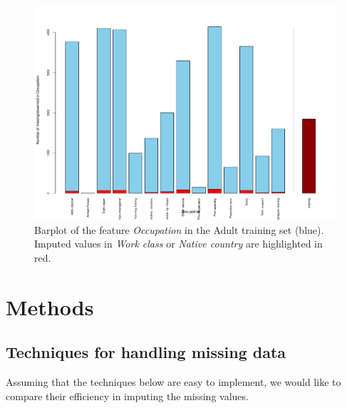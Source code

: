 \documentclass[12pt]{article}
\begin{document}
\begin{figure}[htbp] 
   \centering
   \includegraphics[scale=0.6]{barplot-occ-missing.pdf} 
   \caption{Barplot of the feature \textit{Occupation} in the Adult training set (blue). Imputed values in \textit{Work class} or \textit{Native country} are highlighted in red.}
   \label{barplot-occ-missing}
\end{figure}

\section{Methods}


\subsection{Techniques for handling missing data}
Assuming that the techniques below are easy to implement, we would like to compare their efficiency in imputing the missing values.
\end{document}
